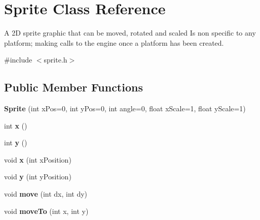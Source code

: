 \hypertarget{class_sprite}{\section{Sprite Class Reference}
\label{class_sprite}
}


A 2\-D sprite graphic that can be moved, rotated and scaled Is non specific to any platform; making calls to the engine once a platform has been created.  




{\ttfamily \#include $<$sprite.\-h$>$}

\subsection*{Public Member Functions}
\begin{DoxyCompactItemize}
\item 
\hypertarget{class_sprite_a95a52b9a6911e359de3064fa6d3a5617}{{\bfseries Sprite} (int x\-Pos=0, int y\-Pos=0, int angle=0, float x\-Scale=1, float y\-Scale=1)}\label{class_sprite_a95a52b9a6911e359de3064fa6d3a5617}

\item 
\hypertarget{class_sprite_a94fe4c517497ba88a93b73cde72b29e8}{int {\bfseries x} ()}\label{class_sprite_a94fe4c517497ba88a93b73cde72b29e8}

\item 
\hypertarget{class_sprite_a2c5cebdd000b4c406432da3ce3a71cd6}{int {\bfseries y} ()}\label{class_sprite_a2c5cebdd000b4c406432da3ce3a71cd6}

\item 
\hypertarget{class_sprite_ad8d8da2bddcc3819ad6c1c43384b0349}{void {\bfseries x} (int x\-Position)}\label{class_sprite_ad8d8da2bddcc3819ad6c1c43384b0349}

\item 
\hypertarget{class_sprite_a3cc9eb64901a1b5a109a3fd1c7f548b5}{void {\bfseries y} (int y\-Position)}\label{class_sprite_a3cc9eb64901a1b5a109a3fd1c7f548b5}

\item 
\hypertarget{class_sprite_a2b89a3db5c84c3ae082cf71ec292f18b}{void {\bfseries move} (int dx, int dy)}\label{class_sprite_a2b89a3db5c84c3ae082cf71ec292f18b}

\item 
\hypertarget{class_sprite_a751b76bd42d5f922cee4f6890003b849}{void {\bfseries move\-To} (int x, int y)}\label{class_sprite_a751b76bd42d5f922cee4f6890003b849}


\end{DoxyCompactItemize}
